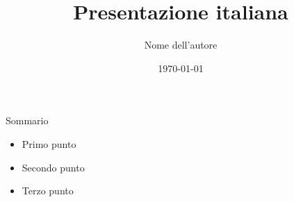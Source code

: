 \documentclass{beamer}
\title{Presentazione italiana}
\author{Nome dell'autore}
\date{\today}
\begin{document}
\begin{frame}
  \titlepage
\end{frame}

\begin{frame}{Sommario}
  \begin{itemize}
    \item Primo punto
    \item Secondo punto
    \item Terzo punto
  \end{itemize}
\end{frame}
\end{document}

